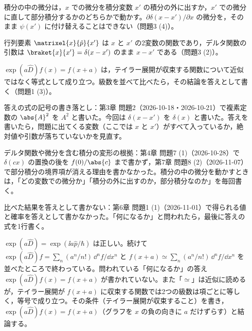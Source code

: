 \begin{daiji}
  \item 積分の中の微分は，$x$ での微分を積分変数 $x'$ の積分の外に出すか，$x'$ での微分に直して部分積分するかのどちらかで動かす。$\partial\delta(x-x')/\partial x$ の微分を，そのまま $\psi(x')$ に付け替えることはできない（問題3 (4)）。
  \item 行列要素 $\matrixel{x}{\hat{p}}{x'}$ は $x$ と $x'$ の2変数の関数であり，デルタ関数の引数は $\braket{x}{x'}=\delta(x-x')$ のまま $x-x'$ である（問題3 (2)）。
  \item $\exp(a\hat{D})f(x)=f(x+a)$ は，テイラー展開が収束する関数について近似ではなく等式として成り立つ。級数を並べて比べたら，その結論を答えとして書く（問題1 (3)）。
\end{daiji}
\begin{maemo}
  \item 答えの式の記号の書き落とし：第3章 問題2（2026-10-18・2026-10-21）で複素定数の $\abs{A}^{2}$ を $A^{2}$ と書いた。今回は $\delta(x-x')$ を $\delta(x)$ と書いた。答えを書いたら，問題に出てくる変数（ここでは $x$ と $x'$）がすべて入っているか，絶対値や引数が落ちていないかを見直す。
  \item デルタ関数や微分を含む積分の変形の根拠：第4章 問題7 (1)（2026-10-28）で $\delta(cx)$ の置換の後を $f(0)/\abs{c}$ まで書かず，第7章 問題8 (2)（2026-11-07）で部分積分の境界項が消える理由を書かなかった。積分の中の微分を動かすときは，「どの変数での微分か」「積分の外に出すのか，部分積分なのか」を毎回書く。
  \item 比べた結果を答えとして書かない：第6章 問題1 (1)（2026-11-01）で得られる値と確率を答えとして書かなかった。「何になるか」と問われたら，最後に答えの式を1行書く。
\end{maemo}
\begin{kotaeran}
   $\exp(a\hat{D})=\exp(\ii a\hat{p}/\hbar)$ は正しい。続けて $\exp(a\hat{D})f=\sum_{n}(a^{n}/n!)\,\dd^{n}f/\dd x^{n}$ と $f(x+a)\simeq\sum_{n}(a^{n}/n!)\,\dd^{n}f/\dd x^{n}$ を並べたところで終わっている。問われている「何になるか」の答え $\exp(a\hat{D})f(x)=f(x+a)$ が書かれていない。また「$\simeq$」は近似に読めるが，テイラー展開が $f(x+a)$ に収束する関数では2つの級数は項ごとに等しく，等号で成り立つ。その条件（テイラー展開が収束すること）を書き，$\exp(a\hat{D})f(x)=f(x+a)$（グラフを $x$ の負の向きに $a$ だけずらす）と結論する。
\end{kotaeran}
